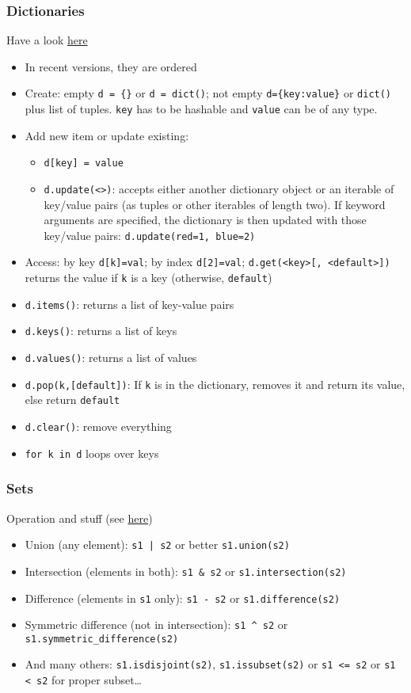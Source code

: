 \documentclass[a4paper,12pt,%
              final%
              ]{article}
\begin{document}
\subsubsection{Dictionaries}
Have a look \href{https://realpython.com/python-dicts/}{here}
\begin{itemize}
  \item In recent versions, they are ordered
  \item Create: empty \verb|d = {}| or \verb|d = dict()|; not empty \verb|d={key:value}| or \verb|dict()| plus list of tuples. \verb|key| has to be hashable and \verb|value| can be of any type.
  \item Add new item or update existing:
    \begin{itemize}
      \item \verb|d[key] = value|
      \item \verb|d.update(<>)|: accepts either another dictionary object or an iterable of key/value pairs (as tuples or other iterables of length two). If keyword arguments are specified, the dictionary is then updated with those key/value pairs: \verb|d.update(red=1, blue=2)|
    \end{itemize}
  \item Access: by key \verb|d[k]=val|; by index \verb|d[2]=val|; \verb|d.get(<key>[, <default>])| returns the value if \texttt{k} is a key (otherwise, \texttt{default})
  \item \verb|d.items()|: returns a list of key-value pairs
  \item \verb|d.keys()|: returns a list of keys
  \item \verb|d.values()|: returns a list of values
  \item \verb|d.pop(k,[default])|: If \texttt{k} is in the dictionary, removes it and return its value, else return \texttt{default}
  \item \verb|d.clear()|: remove everything
  \item \verb|for k in d| loops over keys
\end{itemize}

\subsubsection{Sets}
Operation and stuff (see \href{https://realpython.com/python-sets/}{here})
\begin{itemize}
  \item Union (any element): \verb!s1 | s2! or better \verb|s1.union(s2)|
  \item Intersection (elements in both): \verb|s1 & s2| or \verb|s1.intersection(s2)|
  \item Difference (elements in \verb|s1| only): \verb|s1 - s2| or \verb|s1.difference(s2)|
  \item Symmetric difference (not in intersection): \verb|s1 ^ s2| or \verb|s1.symmetric_difference(s2)|
  \item And many others: \verb|s1.isdisjoint(s2)|, \verb|s1.issubset(s2)| or \verb|s1 <= s2| or \verb|s1 < s2| for proper subset\ldots
\end{itemize}
\end{document}
